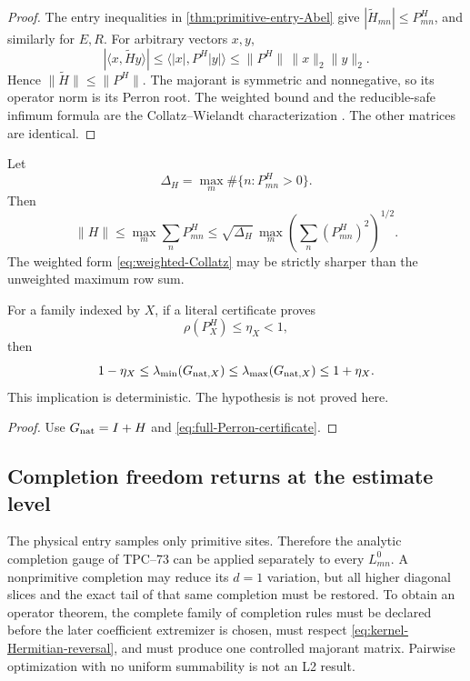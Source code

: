 \begin{proof}
The entry inequalities in
\cref{thm:primitive-entry-Abel} give
\(|\widetilde H_{mn}|\le P^H_{mn}\), and similarly for \(E,R\).
For arbitrary vectors \(x,y\),
\[
 |\langle x,\widetilde H y\rangle|
 \le
 \langle |x|,P^H|y|\rangle
 \le
 \|P^H\|\,\|x\|_2\|y\|_2.
\]
Hence \(\|\widetilde H\|\le\|P^H\|\).  The majorant is symmetric and
nonnegative, so its operator norm is its Perron root.  The weighted bound
and the reducible-safe infimum formula are the Collatz--Wielandt
characterization \citep{BermanPlemmons1994}.  The other matrices are
identical.
\end{proof}

\begin{corollary}
\label{cor:Schur-row-star}
Let
\[
 \Delta_H
 =
 \max_m\#\{n:P^H_{mn}>0\}.
\]
Then
\begin{equation}
 \|H\|
 \le
 \max_m\sum_nP^H_{mn}
 \le
 \sqrt{\Delta_H}\,
 \max_m\left(\sum_n(P^H_{mn})^2\right)^{1/2}.
 \label{eq:row-star-majorant}
\end{equation}
The weighted form \eqref{eq:weighted-Collatz} may be strictly sharper than
the unweighted maximum row sum.
\end{corollary}

\begin{corollary}
\label{cor:conditional-Gram}
For a family indexed by \(X\), if a literal certificate proves
\[
 \rho(P_X^H)\le\eta_X<1,
\]
then
\[
 1-\eta_X
 \le
 \lambda_{\min}(G_{{\rm nat},X})
 \le
 \lambda_{\max}(G_{{\rm nat},X})
 \le
 1+\eta_X.
\]
This implication is deterministic.  The hypothesis is not proved here.
\end{corollary}

\begin{proof}
Use \(G_{\rm nat}=I+H\) and
\eqref{eq:full-Perron-certificate}.
\end{proof}

\subsection{Completion freedom returns at the estimate level}

The physical entry samples only primitive sites.  Therefore the analytic
completion gauge of TPC--73 can be applied separately to every
\(L_{mn}^{0}\).  A nonprimitive completion may reduce its \(d=1\)
variation, but all higher diagonal slices and the exact tail of that same
completion must be restored.  To obtain an operator theorem, the complete
family of completion rules must be declared before the later coefficient
extremizer is chosen, must respect
\eqref{eq:kernel-Hermitian-reversal}, and must produce one controlled
majorant matrix.  Pairwise optimization with no uniform summability is
not an L2 result.
